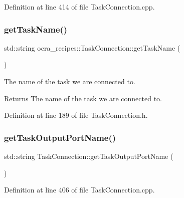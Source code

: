 Definition at line 414 of file Task\+Connection.\+cpp.

\hypertarget{classocra__recipes_1_1TaskConnection_ad33b58e0bf6e0f7051b0187435b014f9}{}\label{classocra__recipes_1_1TaskConnection_ad33b58e0bf6e0f7051b0187435b014f9} 
\subsubsection{\texorpdfstring{get\+Task\+Name()}{getTaskName()}}
{\footnotesize\ttfamily std\+::string ocra\+\_\+recipes\+::\+Task\+Connection\+::get\+Task\+Name (\begin{DoxyParamCaption}{ }\end{DoxyParamCaption})\hspace{0.3cm}{\ttfamily [inline]}}

The name of the task we are connected to.

\begin{DoxyReturn}{Returns}
The name of the task we are connected to. 
\end{DoxyReturn}


Definition at line 189 of file Task\+Connection.\+h.

\hypertarget{classocra__recipes_1_1TaskConnection_add06cf3474cdf145340850854c67ccd1}{}\label{classocra__recipes_1_1TaskConnection_add06cf3474cdf145340850854c67ccd1} 
\subsubsection{\texorpdfstring{get\+Task\+Output\+Port\+Name()}{getTaskOutputPortName()}}
{\footnotesize\ttfamily std\+::string Task\+Connection\+::get\+Task\+Output\+Port\+Name (\begin{DoxyParamCaption}{ }\end{DoxyParamCaption})}



Definition at line 406 of file Task\+Connection.\+cpp.

\hypertarget{classocra__recipes_1_1TaskConnection_ae85f5279d0fe6b8c63ee9736f6308583}{}\label{classocra__recipes_1_1TaskConnection_ae85f5279d0fe6b8c63ee9736f6308583} 
